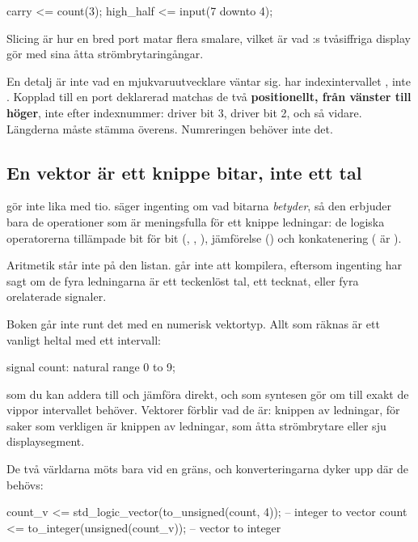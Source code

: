 \begin{vhdlcode}
carry     <= count(3);
high_half <= input(7 downto 4);
\end{vhdlcode}

Slicing är hur en bred port matar flera smalare, vilket är vad :s
tvåsiffriga display gör med sina åtta strömbrytaringångar.

En detalj är inte vad en mjukvaruutvecklare väntar sig.  har
indexintervallet , inte . Kopplad till en port deklarerad
 matchas de två \textbf{positionellt, från vänster till höger},
inte efter indexnummer:  driver bit 3,  driver bit 2, och så vidare.
Längderna måste stämma överens. Numreringen behöver inte det.

\subsection*{En vektor är ett knippe bitar, inte ett tal}
 gör inte  lika med tio.  säger ingenting
om vad bitarna \emph{betyder}, så den erbjuder bara de operationer som är meningsfulla för ett
knippe ledningar: de logiska operatorerna tillämpade bit för bit (, ,
), jämförelse () och konkatenering ( är
).

Aritmetik står inte på den listan.  går inte att kompilera, eftersom ingenting har
sagt om de fyra ledningarna är ett teckenlöst tal, ett tecknat, eller fyra orelaterade signaler.

Boken går inte runt det med en numerisk vektortyp. Allt som räknas är ett vanligt heltal med ett
intervall:

\begin{vhdlcode}
signal count: natural range 0 to 9;
\end{vhdlcode}

som du kan addera till och jämföra direkt, och som syntesen gör om till exakt de vippor
intervallet behöver. Vektorer förblir vad de är: knippen av ledningar, för saker som verkligen är
knippen av ledningar, som åtta strömbrytare eller sju displaysegment.

De två världarna möts bara vid en gräns, och konverteringarna dyker upp där de behövs:

\begin{vhdlcode}
count_v <= std_logic_vector(to_unsigned(count, 4));   -- integer to vector
count   <= to_integer(unsigned(count_v));             -- vector to integer
\end{vhdlcode}

